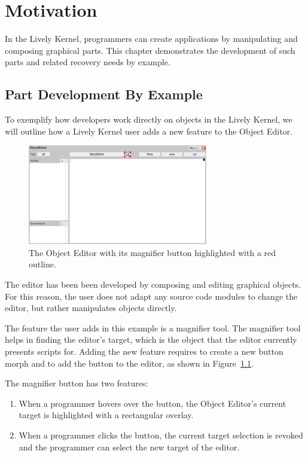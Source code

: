 \chapter{Motivation} \label{chapter:MOTIVATION}

In the Lively Kernel, programmers can create applications by manipulating and composing graphical parts.
This chapter demonstrates the development of such parts and related recovery needs by example.


\section{Part Development By Example}

To exemplify how developers work directly on objects in the Lively Kernel, we will outline how a Lively Kernel user adds a new feature to the Object Editor.

\begin{figure}[h]
    \centering
    \includegraphics[width=0.7\textwidth]{figures/3_motivation/1_magnifierButton.png}
    \caption{The Object Editor with its magnifier button highlighted with a red outline.}
    \label{fig:MagnifierButton}
\end{figure}

The editor has been been developed by composing and editing graphical objects.
For this reason, the user does not adapt any source code modules to change the editor, but rather manipulates objects directly.

The feature the user adds in this example is a magnifier tool.
The magnifier tool helps in finding the editor's target, which is the object that the editor currently presents scripts for.
Adding the new feature requires to create a new button morph and to add the button to the editor, as shown in Figure~\ref{fig:MagnifierButton}.

The magnifier button has two features:
\begin{enumerate}
    \item When a programmer hovers over the button, the Object Editor's current target is highlighted with a rectangular overlay.
    \item When a programmer clicks the button, the current target selection is revoked and the programmer can select the new target of the editor.
\end{enumerate}

